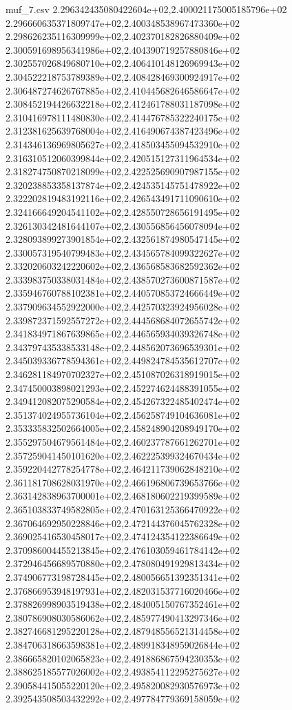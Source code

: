 \begin{filecontents*}{muf_7.csv}
2.296342435080422604e+02,2.400021175005185796e+02
2.296660635371809747e+02,2.400348538967473360e+02
2.298626235116309999e+02,2.402370182826880409e+02
2.300591698956341986e+02,2.404390719257880846e+02
2.302557026849680710e+02,2.406410148126969943e+02
2.304522218753789389e+02,2.408428469300924917e+02
2.306487274626767885e+02,2.410445682646586647e+02
2.308452194426632218e+02,2.412461788031187098e+02
2.310416978111480830e+02,2.414476785322240175e+02
2.312381625639768004e+02,2.416490674387423496e+02
2.314346136969805627e+02,2.418503455094532910e+02
2.316310512060399844e+02,2.420515127311964534e+02
2.318274750870218099e+02,2.422525690907987155e+02
2.320238853358137874e+02,2.424535145751478922e+02
2.322202819483192116e+02,2.426543491711090610e+02
2.324166649204541102e+02,2.428550728656191495e+02
2.326130342481644107e+02,2.430556856456078094e+02
2.328093899273901854e+02,2.432561874980547145e+02
2.330057319540799483e+02,2.434565784099322627e+02
2.332020603242220602e+02,2.436568583682592362e+02
2.333983750338031484e+02,2.438570273600871587e+02
2.335946760788102381e+02,2.440570853724666449e+02
2.337909634552922000e+02,2.442570323924956028e+02
2.339872371592557272e+02,2.444568684072655742e+02
2.341834971867639865e+02,2.446565934039326748e+02
2.343797435338533148e+02,2.448562073696539301e+02
2.345039336778594361e+02,2.449824784535612707e+02
2.346281184970702327e+02,2.451087026318919015e+02
2.347450003898021293e+02,2.452274624488391055e+02
2.349412082075290584e+02,2.454267322485402474e+02
2.351374024955736104e+02,2.456258749104636081e+02
2.353335832502664005e+02,2.458248904208949170e+02
2.355297504679561484e+02,2.460237787661262701e+02
2.357259041450101620e+02,2.462225399324670434e+02
2.359220442778254778e+02,2.464211739062848210e+02
2.361181708628031970e+02,2.466196806739653766e+02
2.363142838963700001e+02,2.468180602219399589e+02
2.365103833749582805e+02,2.470163125366470922e+02
2.367064692950228846e+02,2.472144376045762328e+02
2.369025416530458017e+02,2.474124354122386649e+02
2.370986004455213845e+02,2.476103059461784142e+02
2.372946456689570880e+02,2.478080491929813434e+02
2.374906773198728445e+02,2.480056651392351341e+02
2.376866953948197931e+02,2.482031537716020466e+02
2.378826998903519438e+02,2.484005150767352461e+02
2.380786908030586062e+02,2.485977490413297346e+02
2.382746681295220128e+02,2.487948556521314458e+02
2.384706318663598381e+02,2.489918348959026844e+02
2.386665820102065823e+02,2.491886867594230353e+02
2.388625185577026002e+02,2.493854112295275627e+02
2.390584415055220120e+02,2.495820082930576973e+02
2.392543508503432292e+02,2.497784779369158059e+02

\end{filecontents*}
